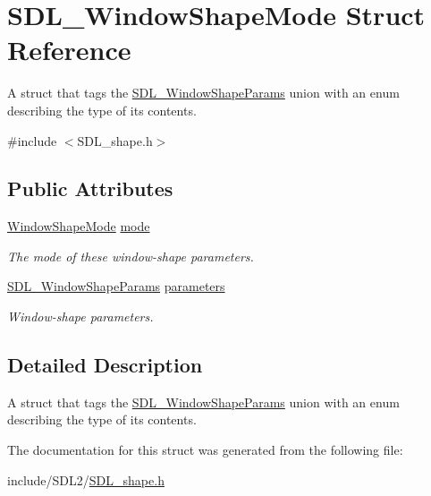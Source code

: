 \hypertarget{struct_s_d_l___window_shape_mode}{}\section{S\+D\+L\+\_\+\+Window\+Shape\+Mode Struct Reference}
\label{struct_s_d_l___window_shape_mode}


A struct that tags the \hyperlink{union_s_d_l___window_shape_params}{S\+D\+L\+\_\+\+Window\+Shape\+Params} union with an enum describing the type of its contents.  




{\ttfamily \#include $<$S\+D\+L\+\_\+shape.\+h$>$}

\subsection*{Public Attributes}
\begin{DoxyCompactItemize}
\item 
\mbox{\label{struct_s_d_l___window_shape_mode_a40ebd8b9a76d982cbd87563386cc05de}} 
\hyperlink{_s_d_l__shape_8h_aa30948f2699e316a43b740eccebe5c20}{Window\+Shape\+Mode} \hyperlink{struct_s_d_l___window_shape_mode_a40ebd8b9a76d982cbd87563386cc05de}{mode}
\begin{DoxyCompactList}\small\item\em The mode of these window-\/shape parameters. \end{DoxyCompactList}\item 
\mbox{\label{struct_s_d_l___window_shape_mode_a2f79bb294034156207fa6d88d3a8c819}} 
\hyperlink{union_s_d_l___window_shape_params}{S\+D\+L\+\_\+\+Window\+Shape\+Params} \hyperlink{struct_s_d_l___window_shape_mode_a2f79bb294034156207fa6d88d3a8c819}{parameters}
\begin{DoxyCompactList}\small\item\em Window-\/shape parameters. \end{DoxyCompactList}\end{DoxyCompactItemize}


\subsection{Detailed Description}
A struct that tags the \hyperlink{union_s_d_l___window_shape_params}{S\+D\+L\+\_\+\+Window\+Shape\+Params} union with an enum describing the type of its contents. 

The documentation for this struct was generated from the following file\+:\begin{DoxyCompactItemize}
\item 
include/\+S\+D\+L2/\hyperlink{_s_d_l__shape_8h}{S\+D\+L\+\_\+shape.\+h}\end{DoxyCompactItemize}
